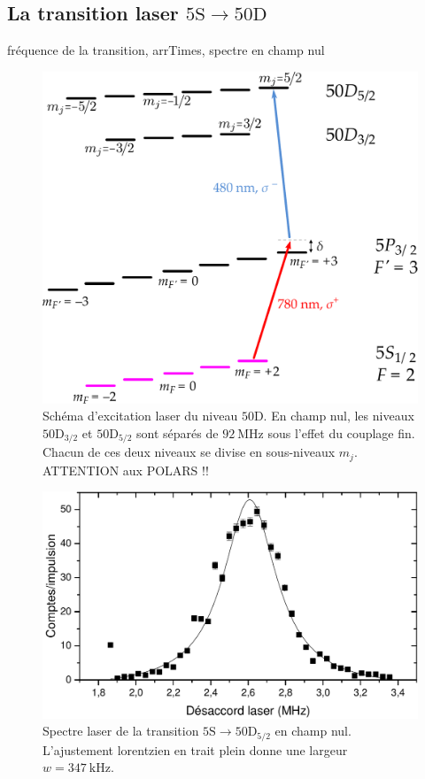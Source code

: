 	\subsection{La transition laser $\mathrm{5S \rightarrow 50D}$}
		\noindent fréquence de la transition, arrTimes, spectre en champ nul \\
		
\begin{figure}[!h]
\centering
\includegraphics[width=0.7\linewidth]{figures/circulars/2photons_5S50D}
\caption[Schéma d'excitation laser du niveau $\mathrm{50D}$]{
Schéma d'excitation laser du niveau $\mathrm{50D}$.
En champ nul, les niveaux $\mathrm{50D}_{3/2}$ et $\mathrm{50D}_{5/2}$ sont séparés de $\SI{92}{\MHz}$ sous l'effet du couplage fin.
Chacun de ces deux niveaux se divise en sous-niveaux $m_j$.
ATTENTION aux POLARS !!
}
\label{fig:2photons_5S50D}
\end{figure}


\begin{figure}[!h]
\centering
\includegraphics[width=0.85\linewidth]{figures/circulars/spectre_laser_champnul}
\caption[Spectre laser de la transition $\mathrm{5S\rightarrow 50D_{5/2}}$ en champ nul]{
Spectre laser de la transition $\mathrm{5S\rightarrow 50D_{5/2}}$ en champ nul.
L'ajustement lorentzien en trait plein donne une largeur $w =\SI{347}{\kHz}$.
}
\label{fig:spectre_laser_champnul}
\end{figure}
		

